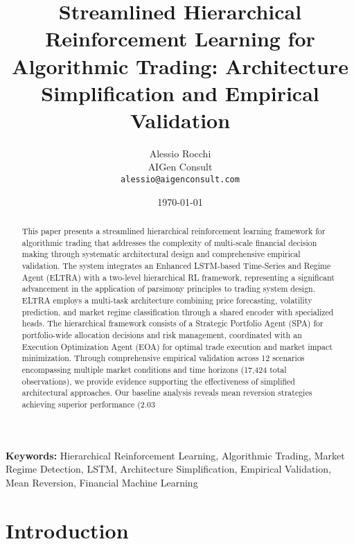 \documentclass[11pt,a4paper]{article}
\title{Streamlined Hierarchical Reinforcement Learning for Algorithmic Trading: Architecture Simplification and Empirical Validation}
\author{Alessio Rocchi\\
AIGen Consult\\
\texttt{alessio@aigenconsult.com}}
\date{\today}
\begin{document}
\maketitle

\begin{abstract}
This paper presents a streamlined hierarchical reinforcement learning framework for algorithmic trading that addresses the complexity of multi-scale financial decision making through systematic architectural design and comprehensive empirical validation. The system integrates an Enhanced LSTM-based Time-Series and Regime Agent (ELTRA) with a two-level hierarchical RL framework, representing a significant advancement in the application of parsimony principles to trading system design. ELTRA employs a multi-task architecture combining price forecasting, volatility prediction, and market regime classification through a shared encoder with specialized heads. The hierarchical framework consists of a Strategic Portfolio Agent (SPA) for portfolio-wide allocation decisions and risk management, coordinated with an Execution Optimization Agent (EOA) for optimal trade execution and market impact minimization. Through comprehensive empirical validation across 12 scenarios encompassing multiple market conditions and time horizons (17,424 total observations), we provide evidence supporting the effectiveness of simplified architectural approaches. Our baseline analysis reveals mean reversion strategies achieving superior performance (2.03%
\end{abstract}

\textbf{Keywords:} Hierarchical Reinforcement Learning, Algorithmic Trading, Market Regime Detection, LSTM, Architecture Simplification, Empirical Validation, Mean Reversion, Financial Machine Learning










\section{Introduction}
\end{document}
